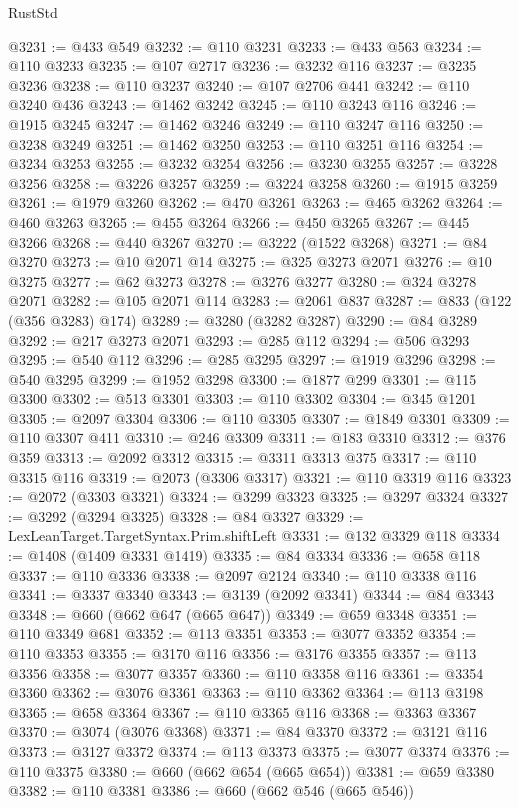 \begin{lexlean}{RustStd}
\begin{coremodule}
{\begin{coremodule}
{{{{{{{{{{{{{{{{{{{{{{{{{{{{{{{{{{{{{{{{{{{{{{{@3231 := @433 @549
@3232 := @110 @3231
@3233 := @433 @563
@3234 := @110 @3233
@3235 := @107 @2717
@3236 := @3232 @116
@3237 := @3235 @3236
@3238 := @110 @3237
@3240 := @107 @2706 @441
@3242 := @110 @3240 @436
@3243 := @1462 @3242
@3245 := @110 @3243 @116
@3246 := @1915 @3245
@3247 := @1462 @3246
@3249 := @110 @3247 @116
@3250 := @3238 @3249
@3251 := @1462 @3250
@3253 := @110 @3251 @116
@3254 := @3234 @3253
@3255 := @3232 @3254
@3256 := @3230 @3255
@3257 := @3228 @3256
@3258 := @3226 @3257
@3259 := @3224 @3258
@3260 := @1915 @3259
@3261 := @1979 @3260
@3262 := @470 @3261
@3263 := @465 @3262
@3264 := @460 @3263
@3265 := @455 @3264
@3266 := @450 @3265
@3267 := @445 @3266
@3268 := @440 @3267
@3270 := @3222 (@1522 @3268)
@3271 := @84 @3270
@3273 := @10 @2071 @14
@3275 := @325 @3273 @2071
@3276 := @10 @3275
@3277 := @62 @3273
@3278 := @3276 @3277
@3280 := @324 @3278 @2071
@3282 := @105 @2071 @114
@3283 := @2061 @837
@3287 := @833 (@122 (@356 @3283) @174)
@3289 := @3280 (@3282 @3287)
@3290 := @84 @3289
@3292 := @217 @3273 @2071
@3293 := @285 @112
@3294 := @506 @3293
@3295 := @540 @112
@3296 := @285 @3295
@3297 := @1919 @3296
@3298 := @540 @3295
@3299 := @1952 @3298
@3300 := @1877 @299
@3301 := @115 @3300
@3302 := @513 @3301
@3303 := @110 @3302
@3304 := @345 @1201
@3305 := @2097 @3304
@3306 := @110 @3305
@3307 := @1849 @3301
@3309 := @110 @3307 @411
@3310 := @246 @3309
@3311 := @183 @3310
@3312 := @376 @359
@3313 := @2092 @3312
@3315 := @3311 @3313 @375
@3317 := @110 @3315 @116
@3319 := @2073 (@3306 @3317)
@3321 := @110 @3319 @116
@3323 := @2072 (@3303 @3321)
@3324 := @3299 @3323
@3325 := @3297 @3324
@3327 := @3292 (@3294 @3325)
@3328 := @84 @3327
@3329 := LexLeanTarget.TargetSyntax.Prim.shiftLeft
@3331 := @132 @3329 @118
@3334 := @1408 (@1409 @3331 @1419)
@3335 := @84 @3334
@3336 := @658 @118
@3337 := @110 @3336
@3338 := @2097 @2124
@3340 := @110 @3338 @116
@3341 := @3337 @3340
@3343 := @3139 (@2092 @3341)
@3344 := @84 @3343
@3348 := @660 (@662 @647 (@665 @647))
@3349 := @659 @3348
@3351 := @110 @3349 @681
@3352 := @113 @3351
@3353 := @3077 @3352
@3354 := @110 @3353
@3355 := @3170 @116
@3356 := @3176 @3355
@3357 := @113 @3356
@3358 := @3077 @3357
@3360 := @110 @3358 @116
@3361 := @3354 @3360
@3362 := @3076 @3361
@3363 := @110 @3362
@3364 := @113 @3198
@3365 := @658 @3364
@3367 := @110 @3365 @116
@3368 := @3363 @3367
@3370 := @3074 (@3076 @3368)
@3371 := @84 @3370
@3372 := @3121 @116
@3373 := @3127 @3372
@3374 := @113 @3373
@3375 := @3077 @3374
@3376 := @110 @3375
@3380 := @660 (@662 @654 (@665 @654))
@3381 := @659 @3380
@3382 := @110 @3381
@3386 := @660 (@662 @546 (@665 @546))
}}}}}}}}}}}}}}}}}}}}}}}}}}}}}}}}}}}}}}}}}}}}}}}
\end{coremodule}}
\end{coremodule}
\end{lexlean}
